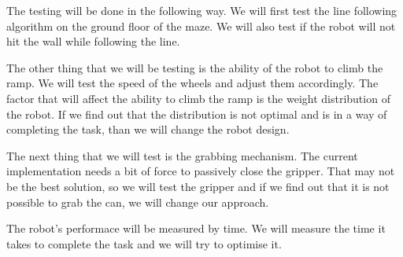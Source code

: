 \documentclass{article}
\begin{document}
The testing will be done in the following way. We will first test the line following algorithm on the ground floor of
the maze. We will also test if the robot will not hit the wall while following the line.

The other thing that we will be testing is the ability of the robot to climb the ramp. We will test the speed of the
wheels and adjust them accordingly. The factor that will affect the ability to climb the ramp is the weight distribution
of the robot. If we find out that the distribution is not optimal and is in a way of completing the task, than we will
change the robot design.

The next thing that we will test is the grabbing mechanism. The current implementation needs a bit of force to passively
close the gripper. That may not be the best solution, so we will test the gripper and if we find out that it is not
possible to grab the can, we will change our approach.

The robot's performace will be measured by time. We will measure the time it takes to complete the task and we will try
to optimise it.
\end{document}
